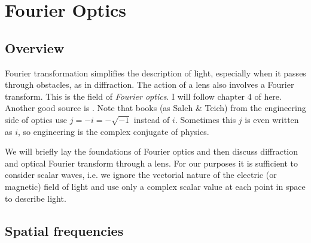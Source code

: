 \renewcommand{\lastmod}{October 23, 2024}
\renewcommand{\chapterauthors}{Markus Lippitz}

\chapter{Fourier Optics}

\section{Overview}
Fourier transformation simplifies the description of light, especially when it passes through obstacles, as in diffraction. The action of a lens also involves a Fourier transform. This is the field of \emph{Fourier optics}. I will follow chapter 4 of \cite{SalehTeich1991} here. Another good source is \cite{Goodman2005}. Note that books (as Saleh \& Teich) from the engineering  side of optics use $j = - i = - \sqrt{-1}$ instead of $i$. Sometimes this $j$ is even written as $i$, so engineering is the complex conjugate of physics.


We will briefly lay the foundations of Fourier optics and then discuss diffraction and optical Fourier transform through a lens. For our purposes it is sufficient to consider scalar waves, i.e. we ignore the vectorial nature of the electric (or magnetic) field of light and use only a complex scalar value at each point in space to describe light.

\section{Spatial frequencies}

